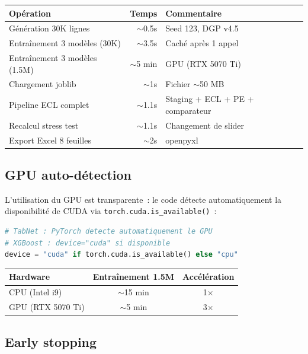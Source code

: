 \documentclass[12pt,a4paper]{article}
\begin{document}
\begin{center}
\begin{tabular}{lrp{5cm}}
\toprule
\textbf{Op\'eration} & \textbf{Temps} & \textbf{Commentaire} \\
\midrule
G\'en\'eration 30K lignes & $\sim$0.5s & Seed 123, DGP v4.5 \\
Entra\^inement 3 mod\`eles (30K) & $\sim$3.5s & Cach\'e apr\`es 1\ier{} appel \\
Entra\^inement 3 mod\`eles (1.5M) & $\sim$5 min & GPU (RTX 5070 Ti) \\
Chargement joblib & $\sim$1s & Fichier $\sim$50 MB \\
Pipeline ECL complet & $\sim$1.1s & Staging + ECL + PE + comparateur \\
Recalcul stress test & $\sim$1.1s & Changement de slider \\
Export Excel 8 feuilles & $\sim$2s & openpyxl \\
\bottomrule
\end{tabular}
\end{center}

\subsection{GPU auto-d\'etection}

L'utilisation du GPU est transparente~: le code d\'etecte automatiquement la disponibilit\'e de CUDA via \texttt{torch.cuda.is\_available()}~:

\begin{lstlisting}[language=Python]
# TabNet : PyTorch detecte automatiquement le GPU
# XGBoost : device="cuda" si disponible
device = "cuda" if torch.cuda.is_available() else "cpu"
\end{lstlisting}

\begin{center}
\begin{tabular}{lcc}
\toprule
\textbf{Hardware} & \textbf{Entra\^inement 1.5M} & \textbf{Acc\'el\'eration} \\
\midrule
CPU (Intel i9) & $\sim$15 min & 1$\times$ \\
GPU (RTX 5070 Ti) & $\sim$5 min & 3$\times$ \\
\bottomrule
\end{tabular}
\end{center}

\subsection{Early stopping}
\end{document}
